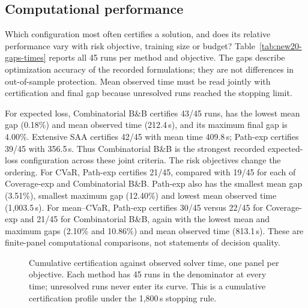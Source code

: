 \subsection{Computational performance}\label{sec:results}

Which configuration most often certifies a solution, and does its
relative performance vary with risk objective, training size or
budget? Table~\ref{tab:new20-gaps-times} reports all 45 runs per
method and objective. The gaps describe optimization accuracy of the
recorded formulations; they are not differences in out-of-sample
protection. Mean observed time must be read jointly with certification
and final gap because unresolved runs reached the stopping limit.

\begin{center}
\begin{minipage}{0.98\linewidth}\centering\small
\setlength{\tabcolsep}{3pt}
\label{tab:new20-gaps-times}

\end{minipage}
\end{center}

For expected loss, Combinatorial B\&B certifies 43/45 runs, has the
lowest mean gap (0.18\%) and mean observed time (212.4\,s), and its
maximum final gap is 4.00\%. Extensive SAA certifies 42/45 with mean
time 409.8\,s; Path-exp certifies 39/45 with 356.5\,s. Thus
Combinatorial B\&B is the strongest recorded expected-loss
configuration across these joint criteria. The risk objectives change
the ordering. For CVaR, Path-exp certifies 21/45, compared with 19/45
for each of Coverage-exp and Combinatorial B\&B. Path-exp also has the
smallest mean gap (3.51\%), smallest maximum gap (12.40\%) and lowest
mean observed time (1,003.5\,s). For mean--CVaR, Path-exp certifies
30/45 versus 22/45 for Coverage-exp and 21/45 for Combinatorial
B\&B, again with the lowest mean and maximum gaps (2.10\% and
10.86\%) and mean observed time (813.1\,s). These are finite-panel
computational comparisons, not statements of decision quality.

\begin{figure}[t]
\centering

\caption{Cumulative certification against observed solver time, one
panel per objective. Each method has 45 runs in the denominator at
every time; unresolved runs never enter its curve. This is a
cumulative certification profile under the 1,800\,s stopping rule.}
\label{fig:new20-certified}
\end{figure}

